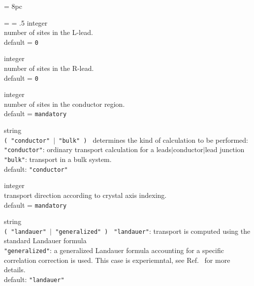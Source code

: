 \newdimen\descindent \descindent = 8pc
{\noindent \leftskip = \descindent \parskip = .5\baselineskip
{}%
{\sc integer} \\ number of sites in the L-lead.
\\ {\sc default} = {\tt 0} \par

\noindent{}%
{\sc integer} \\ number of sites in the R-lead. \\
{\sc default} = {\tt 0} \par

\noindent{}%
{\sc integer} \\ number of sites in the conductor region. \\
{\sc default} = {\tt mandatory} \par

\noindent{}%
{\sc string} \\ {\tt ( "conductor" $\mid$ "bulk" ) }
            determines the kind of calculation to be performed:\\
            {\tt "conductor"}:  ordinary transport calculation for a
                    leads$\mid$conductor$\mid$lead junction\\
            {\tt "bulk"}: transport in a bulk system.\\
            {\sc default}: {\tt "conductor"} \par

\noindent{}%
{\sc integer} \\ transport direction according to crystal axis indexing. \\
{\sc default} = {\tt mandatory} \par

\noindent{}%
{\sc string} \\ {\tt ( "landauer" $\mid$ "generalized" ) }
            {\tt "landauer"}:  transport is computed using the standard Landauer formula \\
            {\tt "generalized"}: a generalized Landauer formula accounting for a
                 specific correlation correction is used. This case is experiemntal, see
                 Ref.~\cite{ferr+05prl, ferr+05prb} for more details. \\
            {\sc default}: {\tt "landauer"} \par

}
